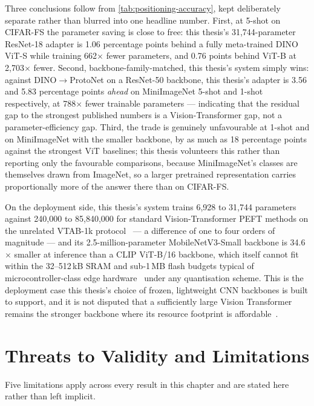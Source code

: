 \documentclass{iutbscthesis}
\begin{document}
Three conclusions follow from \autoref{tab:positioning-accuracy}, kept deliberately separate rather than blurred into one headline number. First, at 5-shot on CIFAR-FS the parameter saving is close to free: this thesis's 31{,}744-parameter ResNet-18 adapter is 1.06 percentage points behind a fully meta-trained DINO ViT-S while training 662$\times$ fewer parameters, and 0.76 points behind ViT-B at 2{,}703$\times$ fewer. Second, backbone-family-matched, this thesis's system simply wins: against DINO$\to$ProtoNet on a ResNet-50 backbone, this thesis's adapter is 3.56 and 5.83 percentage points \emph{ahead} on MiniImageNet 5-shot and 1-shot respectively, at 788$\times$ fewer trainable parameters — indicating that the residual gap to the strongest published numbers is a Vision-Transformer gap, not a parameter-efficiency gap. Third, the trade is genuinely unfavourable at 1-shot and on MiniImageNet with the smaller backbone, by as much as 18 percentage points against the strongest ViT baselines; this thesis volunteers this rather than reporting only the favourable comparisons, because MiniImageNet's classes are themselves drawn from ImageNet, so a larger pretrained representation carries proportionally more of the answer there than on CIFAR-FS.

On the deployment side, this thesis's system trains 6{,}928 to 31{,}744 parameters against 240{,}000 to 85{,}840{,}000 for standard Vision-Transformer PEFT methods on the unrelated VTAB-1k protocol~\cite{lian2022ssf,jia2022vpt,zhou2022coop} — a difference of one to four orders of magnitude — and its 2.5-million-parameter MobileNetV3-Small backbone is 34.6$\times$ smaller at inference than a CLIP ViT-B/16 backbone, which itself cannot fit within the 32--512\,kB SRAM and sub-1\,MB flash budgets typical of microcontroller-class edge hardware~\cite{somvanshi2025tinydl} under any quantisation scheme. This is the deployment case this thesis's choice of frozen, lightweight CNN backbones is built to support, and it is not disputed that a sufficiently large Vision Transformer remains the stronger backbone where its resource footprint is affordable~\cite{simeoni2025dinov3}.

\section{Threats to Validity and Limitations}
\label{sec:results-limitations}

Five limitations apply across every result in this chapter and are stated here rather than left implicit.
\end{document}
